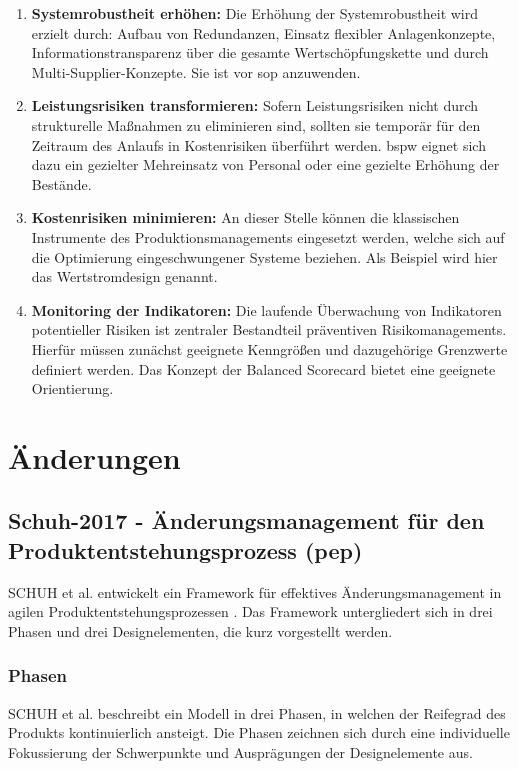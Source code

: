 \begin{enumerate}
 \item \textbf{Systemrobustheit erhöhen: }
 Die Erhöhung der Systemrobustheit wird erzielt durch: Aufbau von Redundanzen, Einsatz flexibler Anlagenkonzepte, Informationstransparenz über die gesamte Wertschöpfungskette und durch Multi-Supplier-Konzepte. Sie ist vor \gls{sop} anzuwenden. 
 \item \textbf{Leistungsrisiken transformieren: }
 Sofern Leistungsrisiken nicht durch strukturelle Maßnahmen zu eliminieren sind, sollten sie temporär für den Zeitraum des Anlaufs in Kostenrisiken überführt werden. \Gls{bspw} eignet sich dazu ein gezielter Mehreinsatz von Personal oder eine gezielte Erhöhung der Bestände. 
 \item \textbf{Kostenrisiken minimieren: }
 An dieser Stelle können die klassischen Instrumente des Produktionsmanagements eingesetzt werden, welche sich auf die Optimierung eingeschwungener Systeme beziehen. Als Beispiel wird hier das Wertstromdesign genannt. 
 \item \textbf{Monitoring der Indikatoren: }
 Die laufende Überwachung von Indikatoren potentieller Risiken ist zentraler Bestandteil präventiven Risikomanagements. 
 Hierfür müssen zunächst geeignete Kenngrößen und dazugehörige Grenzwerte definiert werden. Das Konzept der Balanced Scorecard bietet eine geeignete Orientierung. 
\end{enumerate}

\section{Änderungen}

\subsection*{Schuh-2017 - Änderungsmanagement für den Produktentstehungsprozess (\gls{pep})}\label{sec:schuh2017}
SCHUH et al. entwickelt ein Framework für effektives Änderungsmanagement in agilen Produktentstehungsprozessen \cite{Schuh2017}. Das Framework untergliedert sich in drei Phasen und drei Designelementen, die kurz vorgestellt werden. 

\subsubsection*{Phasen}
SCHUH et al. beschreibt ein Modell in drei Phasen, in welchen der Reifegrad des Produkts kontinuierlich ansteigt. %
Die Phasen zeichnen sich durch eine individuelle Fokussierung der Schwerpunkte und Ausprägungen der Designelemente aus. 

